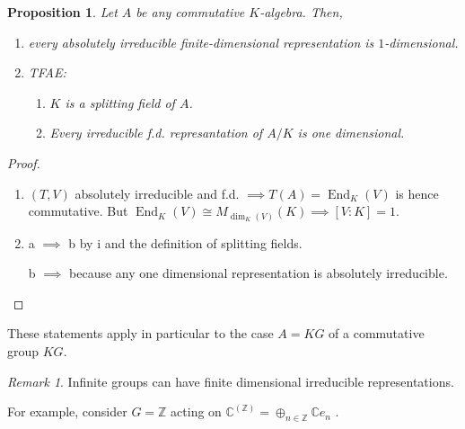 \documentclass{article}
\theoremstyle{definition}
\theoremstyle{plain}
\newtheorem{proposition}[theorem]{Proposition}
\theoremstyle{remark}
\newtheorem*{remark*}{Remark}
\begin{document}
    \begin{proposition}
        Let \(A\) be any commutative \(K\)-algebra. Then,
        
        \begin{enumerate}[label=\roman*)]
            \item every absolutely irreducible finite-dimensional representation is \(1\)-dimensional.
            
            \item TFAE:
            
            \begin{enumerate}[label=\alph*)]
                \item \(K\) is a splitting field of \(A\).
                \item Every irreducible f.d. represantation of \(A / K\) is one dimensional. 
            \end{enumerate} 

        \end{enumerate}
    \end{proposition}

    \begin{proof}
        \begin{enumerate}[label=\roman*)]
            \item \((T,V)\) absolutely irreducible and f.d. \(\implies T(A) = \operatorname{End}_K(V)\) is hence commutative. But \(\operatorname{End}_K(V) \cong M_{\dim_K(V)}(K) \implies [V:K] = 1\).
            
            \item a \(\implies\) b by i and the definition of splitting fields.
            
            b \(\implies\) because any one dimensional representation is absolutely irreducible.
        \end{enumerate} 
    \end{proof}

    These statements apply in particular to the case \(A = KG\) of a commutative group \(KG\).

    \begin{remark*}
        Infinite groups can have finite dimensional irreducible representations.
    \end{remark*}


    For example, consider \(G = \mathbb{Z}\) acting on \(\mathbb{C}^{(\mathbb{Z})} = \oplus_{n\in \mathbb{Z}} \mathbb{C} e_n\) . 
\end{document}
